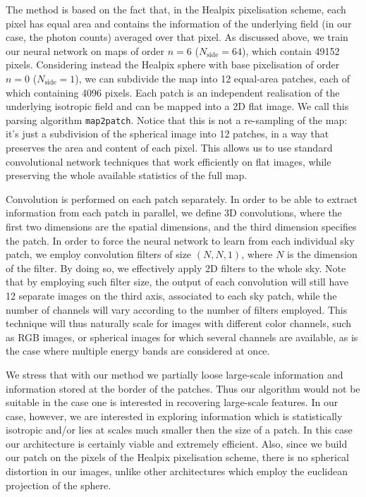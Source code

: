\documentclass[a4paper,11pt]{article}
\begin{document}
The method is based on the fact that, in the Healpix pixelisation scheme, each pixel has equal area and contains the information of the underlying field (in our case, the photon counts) averaged over that pixel. As discussed above, we train our neural network on maps of order $n=6$ ($N_\textrm{side}=64$), which contain 49152 pixels. Considering instead the Healpix sphere with base pixelisation  of order $n=0$ ($N_\textrm{side}=1$), we can subdivide the map into 12 equal-area patches, each of which containing 4096 pixels. Each patch is an independent realisation of the underlying isotropic field and can be mapped into a 2D flat image. We call this parsing algorithm \verb|map2patch|. Notice that this is not a re-sampling of the map: it's just a subdivision of the spherical image into 12 patches, in a way that preserves the area and content of each pixel. This allows us to use standard convolutional network techniques that work efficiently on flat images, while preserving the whole available statistics of the full map.  


Convolution is performed on each patch separately. In order to be able to extract information from each patch in parallel, we define 3D convolutions, where the first two dimensions are the spatial dimensions, and the third dimension specifies the patch. In order to force the neural network to learn from each individual sky patch, we employ convolution filters of size $(N,N,1)$, where $N$ is the dimension of the filter. By doing so, we effectively apply 2D filters to the whole sky. Note that by employing such filter size, the output of each convolution will still have 12 separate images on the third axis, associated to each sky patch, while the number of channels will vary according to the number of filters employed. This technique will thus naturally scale for images with different color channels, such as RGB images, or spherical images for which several channels are available, as is the case where multiple energy bands are considered at once.

{  We stress that with our method we partially loose large-scale information and information stored at the border of the patches.
Thus our algorithm would not be suitable in the case one is interested in recovering large-scale features.
In our case, however, we are interested in exploring information which is  statistically isotropic and/or lies at scales much smaller then the size of a patch. In this case our architecture is certainly viable and extremely efficient.}
Also, since  we  build our patch on the pixels of the Healpix pixelisation scheme, there is no spherical distortion in our images, unlike other architectures which employ the euclidean projection of the sphere.
\end{document}
